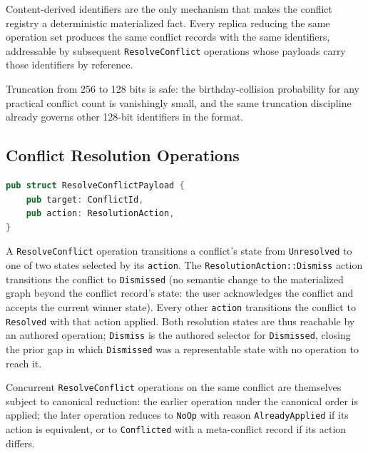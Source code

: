 \documentclass[11pt,letterpaper]{report}
\newcounter{requirement}[chapter]
\begin{document}
\begin{rationale}
  Content-derived identifiers are the only mechanism that makes
  the conflict registry a deterministic materialized fact. Every
  replica reducing the same operation set produces the same
  conflict records with the same identifiers, addressable by
  subsequent \texttt{ResolveConflict} operations whose payloads
  carry those identifiers by reference.

  Truncation from 256 to 128 bits is safe: the birthday-collision
  probability for any practical conflict count is vanishingly
  small, and the same truncation discipline already governs other
  128-bit identifiers in the format.
\end{rationale}

\subsection{Conflict Resolution Operations}
\label{sec:semops:conflict-resolution}

\begin{lstlisting}[language=Rust]
pub struct ResolveConflictPayload {
    pub target: ConflictId,
    pub action: ResolutionAction,
}
\end{lstlisting}

\begin{requirement}
  \label{req:semops:conflict-resolution-state}
  A \texttt{ResolveConflict} operation transitions a conflict's
  state from \texttt{Unresolved} to one of two states selected by its
  \texttt{action}. The \texttt{ResolutionAction::Dismiss} action
  transitions the conflict to \texttt{Dismissed} (no semantic change
  to the materialized graph beyond the conflict record's state: the
  user acknowledges the conflict and accepts the current winner
  state). Every other \texttt{action} transitions the conflict to
  \texttt{Resolved} with that action applied. Both resolution states
  are thus reachable by an authored operation; \texttt{Dismiss} is the
  authored selector for \texttt{Dismissed}, closing the prior gap in
  which \texttt{Dismissed} was a representable state with no operation
  to reach it.

  Concurrent \texttt{ResolveConflict} operations on the same
  conflict are themselves subject to canonical reduction: the
  earlier operation under the canonical order is applied; the
  later operation reduces to \texttt{NoOp} with reason
  \texttt{AlreadyApplied} if its action is equivalent, or to
  \texttt{Conflicted} with a meta-conflict record if its action
  differs.
\end{requirement}
\end{document}
